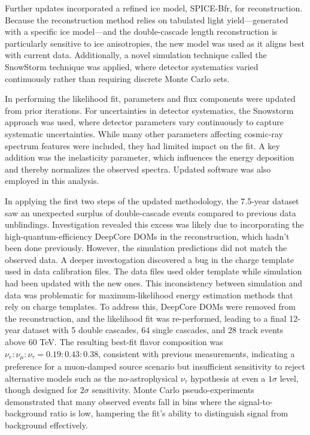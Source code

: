 Further updates incorporated a refined ice model, SPICE-Bfr, for reconstruction. Because the reconstruction method relies on tabulated light yield—generated with a specific ice model—and the double-cascade length reconstruction is particularly sensitive to ice anisotropies, the new model was used as it aligns best with current data. Additionally, a novel simulation technique called the SnowStorm technique was applied, where detector systematics varied continuously rather than requiring discrete Monte Carlo sets.

In performing the likelihood fit, parameters and flux components were updated from prior iterations. For uncertainties in detector systematics, the Snowstorm approach was used, where detector parameters vary continuously to capture systematic uncertainties. While many other parameters affecting cosmic-ray spectrum features were included, they had limited impact on the fit. A key addition was the inelasticity parameter, which influences the energy deposition and thereby normalizes the observed spectra. Updated software was also employed in this analysis.

In applying the first two steps of the updated methodology, the 7.5-year dataset saw an unexpected surplus of double-cascade events compared to previous data unblindings. Investigation revealed this excess was likely due to incorporating the high-quantum-efficiency DeepCore DOMs in the reconstruction, which hadn’t been done previously. However, the simulation predictions did not match the observed data. A deeper investogation discovered a bug in the charge template used in data calibration files. The data files used older template while simulation had been updated with the new ones. This inconsistency between simulation and data was problematic for maximum-likelihood energy estimation methods that rely on charge templates. To address this, DeepCore DOMs were removed from the reconstruction, and the likelihood fit was re-performed, leading to a final 12-year dataset with 5 double cascades, 64 single cascades, and 28 track events above 60 TeV. The resulting best-fit flavor composition was $\nu_e : \nu_\mu : \nu_\tau=0.19:0.43:0.38$, consistent with previous measurements, indicating a preference for a muon-damped source scenario but insufficient sensitivity to reject alternative models such as the no-astrophysical $\nu_\tau$ hypothesis at even a $1\sigma$ level, though designed for $2\sigma$ sensitivity. Monte Carlo pseudo-experiments demonstrated that many observed events fall in bins where the signal-to-background ratio is low, hampering the fit’s ability to distinguish signal from background effectively.

